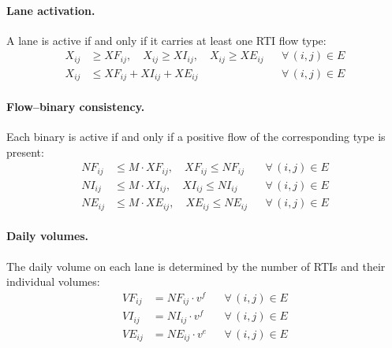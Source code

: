 \paragraph{Lane activation.}
A lane is active if and only if it carries at least one RTI flow type:
%
\begin{align}
  X_{ij} &\geq XF_{ij}, \quad X_{ij} \geq XI_{ij}, \quad X_{ij} \geq XE_{ij}
    && \forall\,(i,j)\in E
    \label{eq:activation-lb}\\
  X_{ij} &\leq XF_{ij} + XI_{ij} + XE_{ij}
    && \forall\,(i,j)\in E
    \label{eq:activation-ub}
\end{align}

\paragraph{Flow--binary consistency.}
Each binary is active if and only if a positive flow of the corresponding type
is present:
%
\begin{align}
  NF_{ij} &\leq M\cdot XF_{ij}, \quad XF_{ij} \leq NF_{ij}
    && \forall\,(i,j)\in E
    \label{eq:binary-full}\\
  NI_{ij} &\leq M\cdot XI_{ij}, \quad XI_{ij} \leq NI_{ij}
    && \forall\,(i,j)\in E
    \label{eq:binary-inlay}\\
  NE_{ij} &\leq M\cdot XE_{ij}, \quad XE_{ij} \leq NE_{ij}
    && \forall\,(i,j)\in E
    \label{eq:binary-empty}
\end{align}

\paragraph{Daily volumes.}
The daily volume on each lane is determined by the number of RTIs and their
individual volumes:
%
\begin{align}
  VF_{ij} &= NF_{ij}\cdot v^{f}
    && \forall\,(i,j)\in E
    \label{eq:vol-full}\\
  VI_{ij} &= NI_{ij}\cdot v^{f}
    && \forall\,(i,j)\in E
    \label{eq:vol-inlay}\\
  VE_{ij} &= NE_{ij}\cdot v^{e}
    && \forall\,(i,j)\in E
    \label{eq:vol-empty}
\end{align}

